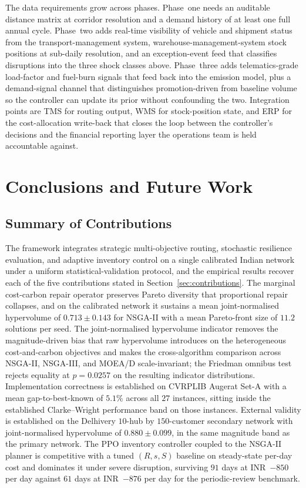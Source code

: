 \documentclass[review,preprint,authoryear,12pt]{elsarticle}
\begin{document}
The data requirements grow across phases. Phase~one needs an
auditable distance matrix at corridor resolution and a demand history
of at least one full annual cycle. Phase~two adds real-time
visibility of vehicle and shipment status from the
transport-management system, warehouse-management-system stock
positions at sub-daily resolution, and an exception-event feed that
classifies disruptions into the three shock classes above. Phase~three
adds telematics-grade load-factor and fuel-burn signals that feed
back into the emission model, plus a demand-signal channel that
distinguishes promotion-driven from baseline volume so the controller
can update its prior without confounding the two. Integration points
are TMS for routing output, WMS for stock-position state, and ERP
for the cost-allocation write-back that closes the loop between the
controller's decisions and the financial reporting layer the
operations team is held accountable against.

\section{Conclusions and Future Work}
\label{sec:conclusions}

\subsection{Summary of Contributions}
\label{sec:conclusions:summary}

The framework integrates strategic multi-objective routing, stochastic
resilience evaluation, and adaptive inventory control on a single
calibrated Indian network under a uniform statistical-validation
protocol, and the empirical results recover each of the five
contributions stated in Section~\ref{sec:contributions}. The
marginal cost-carbon repair operator preserves Pareto diversity that
proportional repair collapses, and on the calibrated network it
sustains a mean joint-normalised hypervolume of
$0.713 \pm 0.143$ for NSGA-II with a mean Pareto-front size of
$11.2$ solutions per seed. The joint-normalised hypervolume indicator
removes the magnitude-driven bias that raw hypervolume introduces on
the heterogeneous cost-and-carbon objectives and makes the
cross-algorithm comparison across NSGA-II, NSGA-III, and MOEA/D
scale-invariant; the Friedman omnibus test rejects equality at
$p = 0.0257$ on the resulting indicator distributions. Implementation
correctness is established on CVRPLIB Augerat Set-A with a mean
gap-to-best-known of $5.1\%$ across all $27$ instances, sitting
inside the established Clarke--Wright performance band on those
instances. External validity is established on the Delhivery $10$-hub
by $150$-customer secondary network with joint-normalised hypervolume
of $0.880 \pm 0.099$, in the same magnitude band as the primary
network. The PPO inventory controller coupled to the NSGA-II planner
is competitive with a tuned $(R, s, S)$ baseline on steady-state
per-day cost and dominates it under severe disruption, surviving
$91$ days at INR~$-850$ per day against $61$ days at INR~$-876$ per
day for the periodic-review benchmark.
\end{document}
